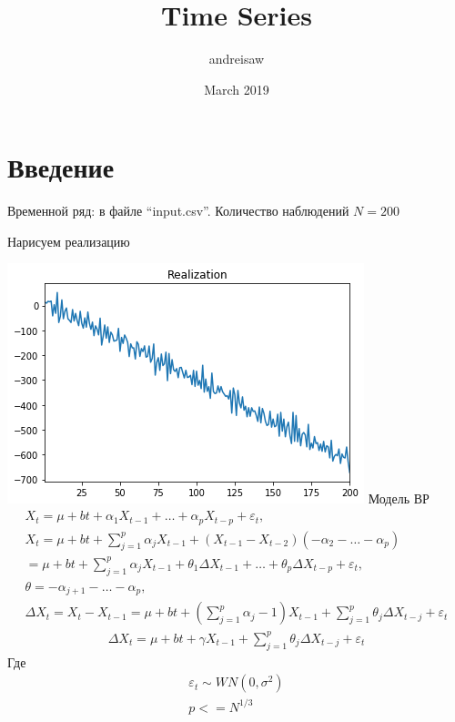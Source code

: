\documentclass{article}
\title{Time Series}
\author{andreisaw}
\date{March 2019}
\begin{document}
\maketitle

\section{Введение}
Временной ряд: в файле ``input.csv''. Количество наблюдений $N=200$

Нарисуем реализацию

\includegraphics[width=\linewidth]{image.png}
Модель ВР \begin{gather*}
    X_t = \mu + bt +\alpha_1X_{t-1} + \ldots + \alpha_p X_{t-p} + \varepsilon_t,\\
    X_t = \mu +bt +\sum_{j=1}^{p}\alpha_jX_{t-1} + (X_{t-1} - X_{t-2})(-\alpha_2-\ldots -\alpha_p)\\
    = \mu + bt +\sum_{j=1}^{p}\alpha_jX_{t-1} + \theta_1\Delta X_{t-1} + \ldots + \theta_p\Delta X_{t-p} +\varepsilon_t,\\ \theta= -\alpha_{j+1}-\ldots-\alpha_p,\\
    \Delta X_t=X_t - X_{t-1}=\mu+bt+(\sum_{j=1}^{p}\alpha_j-1)X_{t-1}+\sum_{j=1}^{p}\theta_j\Delta X_{t-j}+\varepsilon_t
\end{gather*}
\begin{gather}
    \Delta X_t = \mu +bt + \gamma X_{t-1} + \sum_{j=1}^{p}\theta_j \Delta X_{t-j} +\varepsilon_t
\end{gather}
Где 
\begin{gather*}
    \varepsilon_t \sim WN(0,\sigma^2)\\
    p <= N^{1/3}
\end{gather*}
\end{document}

